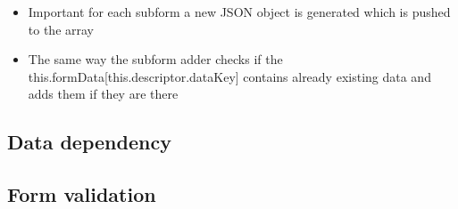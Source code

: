 \begin{itemize}
	\item Important for each subform a new JSON object is generated which is pushed to the array		
	\item The same way the subform adder checks if the this.formData[this.descriptor.dataKey] contains already existing data and adds them if they are there
\end{itemize}

\subsection{Data dependency}

\subsection{Form validation}
